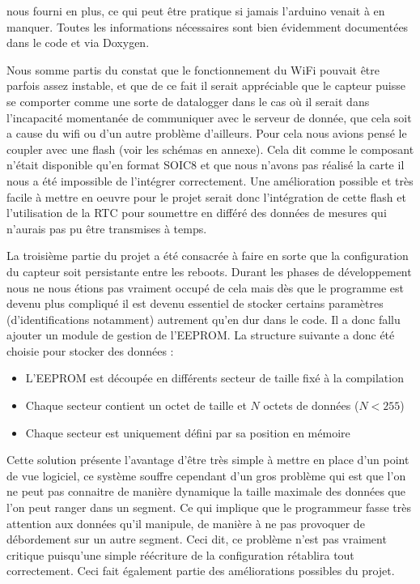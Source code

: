 		nous fourni en plus, ce qui peut être pratique si jamais l'arduino venait à en manquer. Toutes
		les informations nécessaires sont bien évidemment documentées dans le code et via Doxygen.
		\par
		Nous somme partis du constat que le fonctionnement du WiFi pouvait être parfois
		assez instable, et que de ce fait il serait appréciable que le capteur puisse se comporter
		comme une sorte de datalogger dans le cas où il serait dans l'incapacité momentanée de communiquer
		avec le serveur de donnée, que cela soit a cause du wifi ou d'un autre problème d'ailleurs.
		Pour cela nous avions pensé le coupler avec une flash (voir les schémas en annexe). Cela dit
		comme le composant n'était disponible qu'en format SOIC8 et que nous n'avons pas réalisé la carte
		il nous a été impossible de l'intégrer correctement. Une amélioration possible et très facile à
		mettre en oeuvre pour le projet serait donc l'intégration de cette flash et l'utilisation
		de la RTC pour soumettre en différé des données de mesures qui n'aurais pas pu être
		transmises à temps.
		\par
		La troisième partie du projet a été consacrée à faire en sorte que la configuration du capteur
		soit persistante entre les reboots. Durant les phases de développement nous ne nous étions pas
		vraiment occupé de cela mais dès que le programme est devenu plus compliqué il est devenu
		essentiel de stocker certains paramètres (d'identifications notamment) autrement qu'en dur
		dans le code. Il a donc fallu ajouter un module de gestion de l'EEPROM. La structure suivante a donc
		été choisie pour stocker des données :
		\begin{itemize}
			\item L'EEPROM est découpée en différents secteur de taille fixé à la compilation
			\item Chaque secteur contient un octet de taille et $N$ octets de données ($N < 255$)
			\item Chaque secteur est uniquement défini par sa position en mémoire
		\end{itemize}
		
		Cette solution présente l'avantage d'être très simple à mettre en place d'un point de vue
		logiciel, ce système souffre cependant d'un gros problème qui est que l'on ne peut
		pas connaitre de manière dynamique la taille maximale des données que l'on peut ranger
		dans un segment. Ce qui implique que le programmeur fasse très attention aux données qu'il
		manipule, de manière à ne pas provoquer de débordement sur un autre segment. Ceci dit,
		ce problème n'est pas vraiment critique puisqu'une simple réécriture de la configuration
		rétablira tout correctement. Ceci fait également partie des améliorations possibles
		du projet.
		
